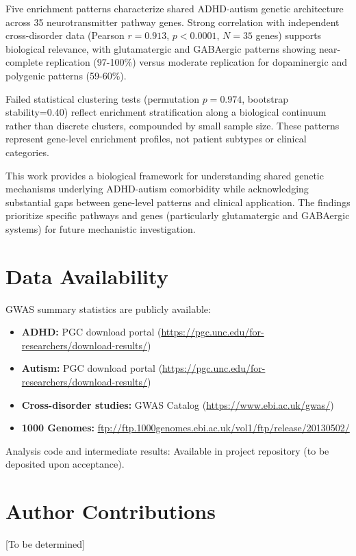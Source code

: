 \documentclass[12pt,letterpaper]{article}
\theoremstyle{definition}
\theoremstyle{remark}
\begin{document}
Five enrichment patterns characterize shared ADHD-autism genetic architecture across 35 neurotransmitter pathway genes. Strong correlation with independent cross-disorder data (Pearson $r=0.913$, $p<0.0001$, $N=35$ genes) supports biological relevance, with glutamatergic and GABAergic patterns showing near-complete replication (97-100\%) versus moderate replication for dopaminergic and polygenic patterns (59-60\%).

Failed statistical clustering tests (permutation $p=0.974$, bootstrap stability=0.40) reflect enrichment stratification along a biological continuum rather than discrete clusters, compounded by small sample size. These patterns represent gene-level enrichment profiles, not patient subtypes or clinical categories.

This work provides a biological framework for understanding shared genetic mechanisms underlying ADHD-autism comorbidity while acknowledging substantial gaps between gene-level patterns and clinical application. The findings prioritize specific pathways and genes (particularly glutamatergic and GABAergic systems) for future mechanistic investigation.

\section{Data Availability}

GWAS summary statistics are publicly available:
\begin{itemize}
    \item \textbf{ADHD:} PGC download portal (\url{https://pgc.unc.edu/for-researchers/download-results/})
    \item \textbf{Autism:} PGC download portal (\url{https://pgc.unc.edu/for-researchers/download-results/})
    \item \textbf{Cross-disorder studies:} GWAS Catalog (\url{https://www.ebi.ac.uk/gwas/})
    \item \textbf{1000 Genomes:} \url{ftp://ftp.1000genomes.ebi.ac.uk/vol1/ftp/release/20130502/}
\end{itemize}

Analysis code and intermediate results: Available in project repository (to be deposited upon acceptance).

\section*{Author Contributions}
[To be determined]
\end{document}
